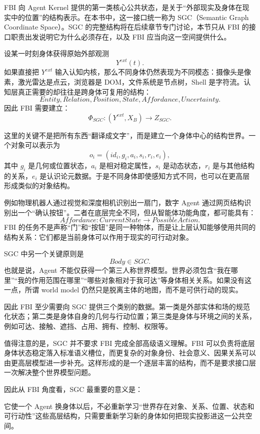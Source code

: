 FBI 向 Agent Kernel 提供的第一类核心公共状态，是关于“外部现实及身体在现实中的位置”的结构表示。在本书中，这一接口统一称为 SGC（Semantic Graph Coordinate Space）。SGC 的完整结构将在后续章节专门讨论，本节只从 FBI 的接口职责出发说明它为什么必须存在，以及 FBI 应当向这一空间提供什么。

设某一时刻身体获得原始外部观测
\[
Y^{ext}(t).
\]
如果直接把 \(Y^{ext}\) 输入认知内核，那么不同身体仍然表现为不同模态：摄像头是像素，激光雷达是点云，浏览器是 DOM，文件系统是节点树，Shell 是字符流。认知层真正需要的却往往是跨身体可复用的结构：
\[
Entity,
Relation,
Position,
State,
Affordance,
Uncertainty.
\]
因此 FBI 需要建立：
\[
\Phi_{SGC}:
(Y^{ext},X_B)
\rightarrow
Z_{SGC}.
\]

这里的关键不是把所有东西“翻译成文字”，而是建立一个身体中心的结构世界。一个对象可以表示为
\[
o_i
=
(
id_i,
g_i,
a_i,
s_i,
r_i,
e_i
),
\]
其中 \(g_i\) 是几何或位置状态，\(a_i\) 是相对稳定属性，\(s_i\) 是动态状态，\(r_i\) 是与其他结构的关系，\(e_i\) 是认识论元数据。于是不同身体即使感知方式不同，也可以在更高层形成类似的对象结构。

例如物理机器人通过视觉和深度相机识别出一扇门，数字 Agent 通过网页结构识别出一个“确认按钮”。二者在底层完全不同，但从智能体功能角度，都可能具有：
\[
Affordance:
CurrentState
\rightarrow
PossibleAction.
\]
FBI 的任务不是声称“门”和“按钮”是同一种物体，而是让上层认知能够使用共同的结构关系：它们都是当前身体可以作用于现实的可行动对象。

SGC 中另一个关键原则是
\[
\boxed{
Body\in SGC.
}
\]
也就是说，Agent 不能仅获得一个第三人称世界模型。世界必须包含“我在哪里”“我的作用范围在哪里”“哪些对象相对于我可达”等身体相关关系。如果没有这一点，所谓 world model 仍然只是脱离主体的地图，而不是可供行动的现实。

因此 FBI 至少需要向 SGC 提供三个类别的数据。第一类是外部实体和场的规范化状态；第二类是身体自身的几何与行动位置；第三类是身体与环境之间的关系，例如可达、接触、遮挡、占用、拥有、控制、权限等。

值得注意的是，SGC 并不要求 FBI 完成全部高级语义理解。FBI 可以负责将底层身体状态稳定落入标准语义槽位，而更复杂的对象身份、社会意义、因果关系可以由更高层模型进一步补充。这样形成的是一个逐层丰富的结构，而不是要求接口层一次解决整个世界模型问题。

因此从 FBI 角度看，SGC 最重要的意义是：
\begin{statementbox}
\centering
{}
\end{statementbox}
它使一个 Agent 换身体以后，不必重新学习“世界存在对象、关系、位置、状态和可行动性”这些高层结构，只需要重新学习新的身体如何把现实投影进这一公共空间。


